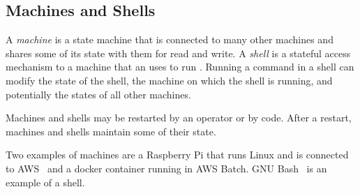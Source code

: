 \subsection{Machines and Shells}
\label{machine}

A \emph{machine} is a state machine that is connected to many other machines and shares some of its state with them for read and write. A \emph{shell} is a stateful access mechanism to a machine that an  uses to run . Running a command in a shell can modify the state of the shell, the machine on which the shell is running, and potentially the states of all other machines. 

Machines and shells may be restarted by an operator or by code. After a restart, machines and shells maintain some of their state. 

Two examples of machines are a Raspberry Pi that runs Linux and is connected to AWS~ and a docker container running in AWS Batch. GNU Bash~ is an example of a shell.